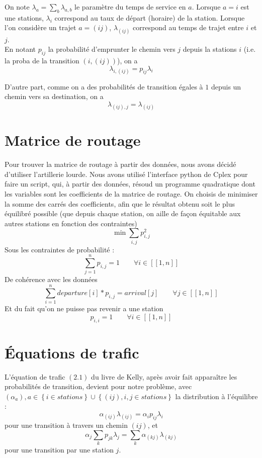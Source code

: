 \documentclass[12pt,a4paper]{article}
\begin{document}
On note $\lambda_a = \sum_b \lambda_{a,b}$ le paramètre du temps de service en $a$.
Lorsque $a = i$ est une stations, $\lambda_i$ correspond au taux de départ (horaire) de la station. Lorsque l'on considère un trajet $a = (ij)$, $\lambda_{(ij)}$ correspond au temps de trajet entre $i$ et $j$.\\


En notant $p_{ij}$ la probabilité d'emprunter le chemin vers $j$ depuis la stations $i$ (i.e. la proba de la transition $\left(i,(ij) \right)$), on a
\begin{equation}
\lambda_{i,(ij)} = p_{ij} \lambda_i
\end{equation}

D'autre part, comme on a des probabilités de transition égales à $1$ depuis un chemin vers sa destination, on a
\begin{equation}
\lambda_{(ij),j} = \lambda_{(ij)}
\end{equation}


\section{Matrice de routage}

Pour trouver la matrice de routage à partir des données, nous avons décidé d'utiliser l'artillerie lourde. Nous avons utilisé l'interface python de Cplex pour faire un script, qui, à partir des données, résoud un programme quadratique dont les variables sont les coefficients de la matrice de routage.
On choisis de minimiser la somme des carrés des coefficients, afin que le résultat obtenu soit le plus équilibré possible (que depuis chaque station, on aille de façon équitable aux autres stations en fonction des contraintes)
\[ 
	\min \sum_{i,j} p_{i,j}^2
\]
Sous les contraintes de probabilité :
\[
	\sum_{j=1}^n p_{i,j} = 1 \qquad \forall i \in [\![1,n]\!]
\]
De cohérence avec les données
\[
	\sum_{i=1}^n departure[i]*p_{i,j} = arrival[j] \qquad \forall j \in [\![1,n]\!]
\]
Et du fait qu'on ne puisse pas revenir a une station
\[
	p_{i,i} = 1 \qquad \forall i \in [\![1,n]\!]
\]


\section{\'Equations de trafic}


L'équation de trafic $(2.1)$ du livre de Kelly, après avoir fait apparaître les probabilités de transition, devient pour notre problème, avec $(\alpha_a), a \in \left\{ i \in stations \right\} \cup \left\{ (ij), i,j \in stations \right\}$  la distribution à l'équilibre :
\begin{equation}
\alpha_{(ij)} \lambda_{(ij)} = \alpha_i p_{ij} \lambda_i
\label{eq:trafic_1}
\end{equation}
pour une transition à travers un chemin $(ij)$, et
\begin{equation}
\alpha_j \sum_k p_{jk} \lambda_j = \sum_k \alpha_{(kj)} \lambda_{(kj)}
\label{eq:trafic_2}
\end{equation}
pour une transition par une station $j$.
\end{document}
